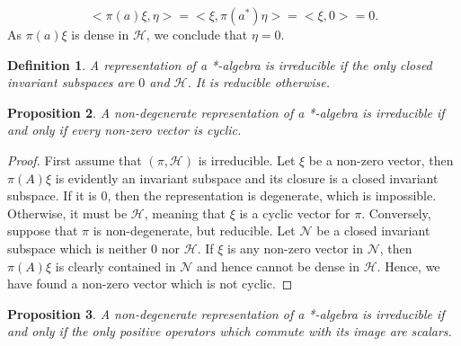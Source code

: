 \documentclass{book}
\newtheorem{definition}{Definition}[section]
\newtheorem{proposition}[definition]{Proposition}
\begin{document}
\[<\pi(a)\xi,\eta >=< \xi,\pi(a^*)\eta >=< \xi,0 >= 0.\]
As \(\pi(a)\xi\) is dense in \(\mathcal{H}\), we conclude that \(\eta = 0\).
\begin{definition}
  A representation of a *-algebra is \textnormal{irreducible} if the only
  closed invariant subspaces are \(0\) and \(\mathcal{H}\). It is \textnormal{reducible} otherwise.
\end{definition}
\begin{proposition}\label{prop:11111}
  A non-degenerate representation of a *-algebra is irreducible if and only if every non-zero vector is cyclic.
\end{proposition}
\begin{proof}
  First assume that \((\pi,\mathcal{H})\) is irreducible. Let \(\xi\) be a non-zero vector,
  then \(\pi(A)\xi\) is evidently an invariant subspace and its closure is a closed
  invariant subspace. If it is \(0\), then the representation is degenerate, which is
  impossible. Otherwise, it must be \(\mathcal{H}\), meaning that \(\xi\) is a cyclic vector for \(\pi\).
  Conversely, suppose that \(\pi\) is non-degenerate, but reducible. Let \(\mathcal{N}\) be
  a closed invariant subspace which is neither \(0\) nor \(\mathcal{H}\). If \(\xi\) is any non-zero
  vector in \(\mathcal{N}\), then \(\pi(A)\xi\) is clearly contained in \(\mathcal{N}\) and hence cannot be dense
  in \(\mathcal{H}\). Hence, we have found a non-zero vector which is not cyclic.
\end{proof}
\begin{proposition}\label{prop:111112}
  A non-degenerate representation of a *-algebra is irreducible if and only if the only positive operators which commute with its
  image are scalars.
\end{proposition}
\end{document}
